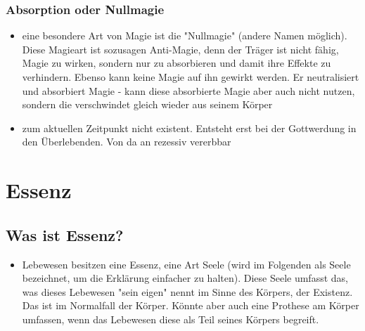 \subsubsection{Absorption oder Nullmagie}
\begin{itemize}
	\item eine besondere Art von Magie ist die "Nullmagie" (andere Namen möglich). Diese Magieart ist sozusagen Anti-Magie, denn der Träger ist nicht fähig, Magie zu wirken, sondern nur zu absorbieren und damit ihre Effekte zu verhindern. Ebenso kann keine Magie auf ihn gewirkt werden. Er neutralisiert und absorbiert Magie - kann diese absorbierte Magie aber auch nicht nutzen, sondern die verschwindet gleich wieder aus seinem Körper
	\item zum aktuellen Zeitpunkt nicht existent. Entsteht erst bei der Gottwerdung in den Überlebenden. Von da an rezessiv vererbbar
\end{itemize}

\clearpage
\section{Essenz}
\subsection{Was ist Essenz?}
\begin{itemize}
	\item Lebewesen besitzen eine Essenz, eine Art Seele (wird im Folgenden als Seele bezeichnet, um die Erklärung einfacher zu halten). Diese Seele umfasst das, was dieses Lebewesen "sein eigen" nennt im Sinne des Körpers, der Existenz. Das ist im Normalfall der Körper. Könnte aber auch eine Prothese am Körper umfassen, wenn das Lebewesen diese als Teil seines Körpers begreift.
\end{itemize}